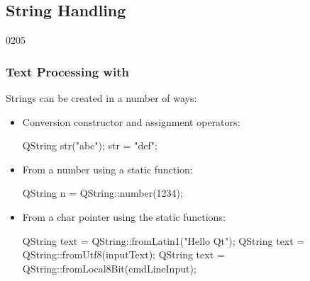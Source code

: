 %
%
%
%

\subsection{String Handling}


\begin{slide}[fragile]{0205}\frametitle{Text Processing with }
  \label{text_processing}
  Strings can be created in a number of ways:
  \begin{itemize}
  \item Conversion constructor and assignment operators:
 \begin{cpp}
QString str("abc");
str = "def";
  \end{cpp}
 \item From a number using a static function:
 \begin{cpp}
QString n = QString::number(1234);
  \end{cpp}
 \item From a char pointer using the static functions:
 \begin{cpp}
QString text = QString::fromLatin1("Hello Qt");
QString text = QString::fromUtf8(inputText);
QString text = QString::fromLocal8Bit(cmdLineInput);
  \end{cpp}
\end{itemize}
\end{slide}

